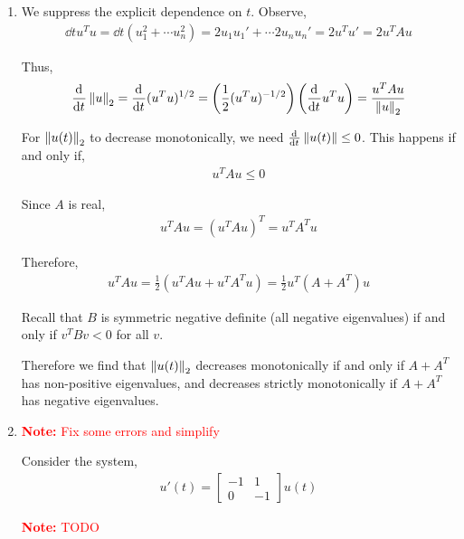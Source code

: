 \documentclass[10pt]{article}
\newcommand{\note}[1]{\textcolor{red}{\textbf{Note:} #1}}
\begin{document}
\begin{solution}[Solution]
\begin{enumerate}[label=(\alph*)]
    \item 
        We suppress the explicit dependence on \( t \). 
        Observe,
        \begin{align*}
            \dd{}{t} u^T u
            = \dd{}{t} \left( u_1^2 + \cdots u_n^2 \right)
            = 2u_1u_1' + \cdots 2u_nu_n'
            = 2 u^T u'
            = 2 u^TAu
        \end{align*}
        
        Thus,
        \begin{align*}
            \frac{\mathrm{d}^{}}{\mathrm{d} t^{}} \left\lVert u\right\rVert_2 
            = \frac{\mathrm{d}^{}}{\mathrm{d} t^{}} (u^Tu)^{1/2}
            = \left(\frac{1}{2} (u^Tu)^{-1/2} \right)\left(\frac{\mathrm{d}^{}}{\mathrm{d} t^{}} u^Tu \right) 
            = \frac{u^TAu}{\left\lVert u\right\rVert_2}
        \end{align*}
        

        For \( \left\lVert u(t)\right\rVert_2 \) to decrease monotonically, we need \( \frac{\mathrm{d}^{}}{\mathrm{d} t^{}} \left\lVert u(t)\right\rVert \leq 0 \). This happens if and only if,
        \begin{align*}
            u^TAu \leq 0
        \end{align*}
        
        Since \( A \) is real,
        \begin{align*}
            u^TAu = (u^TAu)^T = u^TA^Tu  
        \end{align*}

        Therefore,
        \begin{align*}
            u^TAu 
            = \frac{1}{2} \left( u^TAu + u^TA^T u \right)
            = \frac{1}{2} u^T(A+A^T)u
        \end{align*}
        
        Recall that \( B \) is symmetric negative definite (all negative eigenvalues) if and only if \( v^TBv < 0 \) for all \( v \).
        
        Therefore we find that \( \left\lVert u(t)\right\rVert_2 \) decreases monotonically if and only if \( A+A^T \) has non-positive eigenvalues, and decreases strictly monotonically if \( A+A^T \) has negative eigenvalues.
        
    \item

        \note{Fix some errors and simplify}
        
        Consider the system,
        \begin{align*}
            u'(t) = \left[\begin{array}{cc}-1 & 1 \\ 0 & -1 \end{array}\right] u(t)
        \end{align*}

        \note{TODO}

\end{enumerate}
\end{solution}
\end{document}

